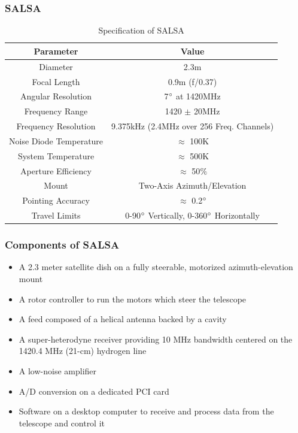 \documentclass{beamer}
\begin{document}

\begin{frame}
\frametitle{SALSA}
\begin{table}
\caption{Specification of SALSA}
\begin{tabular}{|c|c|}
\hline
\textbf{Parameter}&\multicolumn{1}{|c|}{\textbf{Value}} \\
\cline{1-2} 
\hline
Diameter & 2.3m\\
\hline
Focal Length & 0.9m (f/0.37)\\
\hline
Angular Resolution & 7$\degree$ at 1420MHz\\
\hline
Frequency Range & 1420 $\pm$ 20MHz\\
\hline
Frequency Resolution & 9.375kHz (2.4MHz over 256 Freq. Channels)\\
\hline
Noise Diode Temperature & $\approx$ 100K\\
\hline
System Temperature & $\approx$ 500K\\
\hline
Aperture Efficiency & $\approx$ 50$\%$\\
\hline
Mount & Two-Axis Azimuth/Elevation\\
\hline
Pointing Accuracy & $\approx$ 0.2$\degree$\\
\hline
Travel Limits &  0-90$\degree$ Vertically, 0-360$\degree$ Horizontally\\
\hline
\end{tabular}
\label{Tab:salsa_specification}
\end{table}
\end{frame}
\begin{frame}
\frametitle{Components of SALSA}
\begin{itemize}
\item A 2.3 meter satellite dish on a fully steerable, motorized azimuth-elevation mount
\item A rotor controller to run the motors which steer the telescope
\item A feed composed of a helical antenna backed by a cavity
\item A super-heterodyne receiver providing 10 MHz bandwidth centered on the 1420.4 MHz (21-cm) hydrogen line
\item A low-noise amplifier
\item A/D conversion on a dedicated PCI card
\item Software on a desktop computer to receive and process data from the telescope and control it
\end{itemize}
\end{frame}
\end{document}
